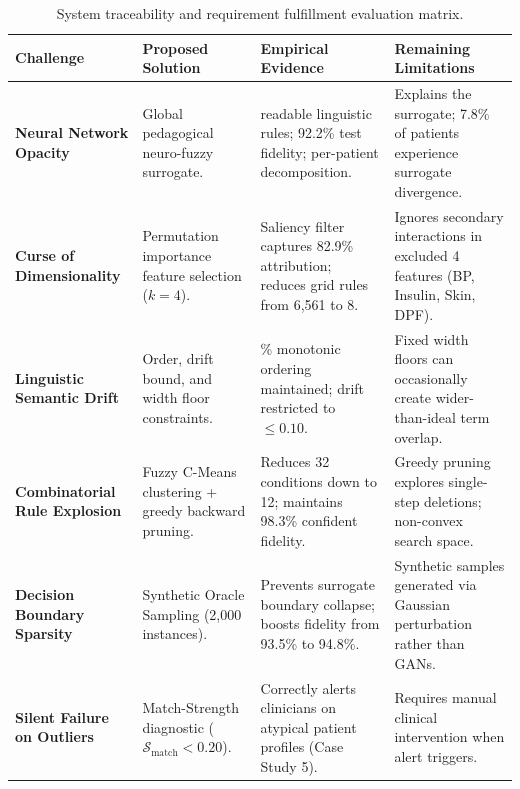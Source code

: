 \documentclass{report}
\begin{document}
\begin{table}[htbp]
\centering
\small
\renewcommand{\arraystretch}{0.9}
\begin{tabularx}{\textwidth}{>{\raggedright\arraybackslash\hsize=0.75\hsize}X >{\raggedright\arraybackslash\hsize=0.85\hsize}X >{\raggedright\arraybackslash\hsize=1.05\hsize}X >{\raggedright\arraybackslash\hsize=1.35\hsize}X}
\toprule
\textbf{Challenge} & \textbf{Proposed Solution} & \textbf{Empirical Evidence} & \textbf{Remaining Limitations} \\
\midrule
\textbf{Neural Network Opacity} & Global pedagogical neuro-fuzzy surrogate. & 4 readable linguistic rules; 92.2\% test fidelity; per-patient decomposition. & Explains the surrogate; 7.8\% of patients experience surrogate divergence. \\
\midrule
\textbf{Curse of Dimensionality} & Permutation importance feature selection ($k=4$). & Saliency filter captures 82.9\% attribution; reduces grid rules from 6,561 to 8. & Ignores secondary interactions in excluded 4 features (BP, Insulin, Skin, DPF). \\
\midrule
\textbf{Linguistic Semantic Drift} & Order, drift bound, and width floor constraints. & 100\% monotonic ordering maintained; drift restricted to $\le 0.10$. & Fixed width floors can occasionally create wider-than-ideal term overlap. \\
\midrule
\textbf{Combinatorial Rule Explosion} & Fuzzy C-Means clustering + greedy backward pruning. & Reduces 32 conditions down to 12; maintains 98.3\% confident fidelity. & Greedy pruning explores single-step deletions; non-convex search space. \\
\midrule
\textbf{Decision Boundary Sparsity} & Synthetic Oracle Sampling (2,000 instances). & Prevents surrogate boundary collapse; boosts fidelity from 93.5\% to 94.8\%. & Synthetic samples generated via Gaussian perturbation rather than GANs. \\
\midrule
\textbf{Silent Failure on Outliers} & Match-Strength diagnostic ($\mathcal{S}_{\text{match}} < 0.20$). & Correctly alerts clinicians on atypical patient profiles (Case Study 5). & Requires manual clinical intervention when alert triggers. \\
\bottomrule
\end{tabularx}
\caption[System Traceability and Requirement Evaluation Matrix]{System traceability and requirement fulfillment evaluation matrix.}
\label{tab:traceability_table}
\end{table}
\end{document}

